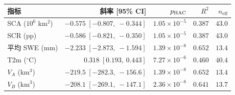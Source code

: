 \begin{tabular}{lrrrr}
\toprule
指标 & 斜率 [95\% CI] & $p_{\rm HAC}$ & $R^2$ & $n_{\mathrm{eff}}$ \\
\midrule
SCA ($10^6$ km$^2$) & $-0.575\;[-0.807,\ -0.344]$ & $1.05\times 10^{-5}$ & $0.387$ & $43.0$ \\
SCR (pp) & $-0.586\;[-0.821,\ -0.350]$ & $1.05\times 10^{-5}$ & $0.387$ & $43.0$ \\
平均 SWE (mm) & $-2.233\;[-2.873,\ -1.594]$ & $1.39\times 10^{-8}$ & $0.652$ & $13.4$ \\
T2m ($^\circ$C) & $0.318\;[0.193,\ 0.443]$ & $7.27\times 10^{-6}$ & $0.460$ & $40.4$ \\
$V_A$ (km$^3$) & $-219.5\;[-282.3,\ -156.6]$ & $1.39\times 10^{-8}$ & $0.652$ & $13.4$ \\
$V_B$ (km$^3$) & $-208.1\;[-269.1,\ -147.1]$ & $2.36\times 10^{-8}$ & $0.641$ & $13.7$ \\
\bottomrule
\end{tabular}
